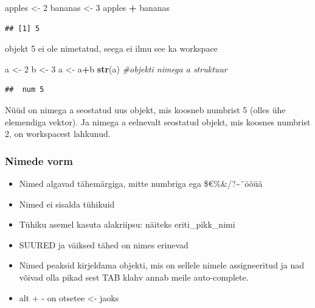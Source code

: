 \documentclass[]{book}
\newcommand{\euro}{€}
\newenvironment{Shaded}{\begin{snugshade}}{\end{snugshade}}
\newcommand{\KeywordTok}[1]{\textcolor[rgb]{0.13,0.29,0.53}{\textbf{#1}}}
\newcommand{\DecValTok}[1]{\textcolor[rgb]{0.00,0.00,0.81}{#1}}
\newcommand{\StringTok}[1]{\textcolor[rgb]{0.31,0.60,0.02}{#1}}
\newcommand{\CommentTok}[1]{\textcolor[rgb]{0.56,0.35,0.01}{\textit{#1}}}
\newcommand{\OperatorTok}[1]{\textcolor[rgb]{0.81,0.36,0.00}{\textbf{#1}}}
\newcommand{\NormalTok}[1]{#1}
\begin{document}
\begin{Shaded}
\begin{Highlighting}[]
\NormalTok{apples <-}\StringTok{ }\DecValTok{2}
\NormalTok{bananas <-}\StringTok{ }\DecValTok{3}
\NormalTok{apples }\OperatorTok{+}\StringTok{ }\NormalTok{bananas}
\end{Highlighting}
\end{Shaded}

\begin{verbatim}
## [1] 5
\end{verbatim}

objekt 5 ei ole nimetatud, seega ei ilmu see ka workspace

\begin{Shaded}
\begin{Highlighting}[]
\NormalTok{a <-}\StringTok{ }\DecValTok{2}
\NormalTok{b <-}\StringTok{ }\DecValTok{3}
\NormalTok{a <-}\StringTok{ }\NormalTok{a}\OperatorTok{+}\NormalTok{b}
\KeywordTok{str}\NormalTok{(a) }\CommentTok{#objekti nimega a struktuur}
\end{Highlighting}
\end{Shaded}

\begin{verbatim}
##  num 5
\end{verbatim}

Nüüd on nimega a seostatud uus objekt, mis koosneb numbrist 5 (olles ühe
elemendiga vektor). Ja nimega a eelnevalt seostatud objekt, mis koosnes
numbrist 2, on workspacest lahkunud.

\subsubsection{Nimede vorm}\label{nimede-vorm}

\begin{itemize}
\item
  Nimed algavad tähemärgiga, mitte numbriga ega
  \$\euro{}\%\&/?\textasciitilde{}ˇöõüä
\item
  Nimed ei sisalda tühikuid
\item
  Tühiku asemel kasuta alakriipsu: näiteks eriti\_pikk\_nimi
\item
  SUURED ja väiksed tähed on nimes erinevad
\item
  Nimed peaksid kirjeldama objekti, mis on sellele nimele assigneeritud
  ja nad võivad olla pikad sest TAB klahv annab meile auto-complete.
\item
  alt + - on otsetee \textless{}- jaoks
\end{itemize}
\end{document}
